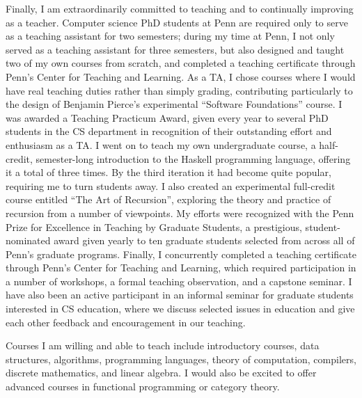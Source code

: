 \documentclass[12pt]{article}
\begin{document}
Finally, I am extraordinarily committed to teaching and to continually
improving as a teacher.  Computer science PhD students at Penn are
required only to serve as a teaching assistant for two semesters;
during my time at Penn, I not only served as a teaching assistant for
three semesters, but also designed and taught two of my own courses
from scratch, and completed a teaching certificate through Penn's
Center for Teaching and Learning.  As a TA, I chose courses where I
would have real teaching duties rather than simply grading,
contributing particularly to the design of Benjamin Pierce's
experimental ``Software Foundations'' course. I was awarded a Teaching
Practicum Award, given every year to several PhD students in the CS
department in recognition of their outstanding effort and enthusiasm
as a TA.  I went on to teach my own undergraduate course, a
half-credit, semester-long introduction to the Haskell programming
language, offering it a total of three times. By the third iteration
it had become quite popular, requiring me to turn students away.  I
also created an experimental full-credit course entitled ``The Art of
Recursion'', exploring the theory and practice of recursion from a
number of viewpoints.  My efforts were recognized with the Penn Prize
for Excellence in Teaching by Graduate Students, a prestigious,
student-nominated award given yearly to ten graduate students selected
from across all of Penn's graduate programs.  Finally, I concurrently
completed a teaching certificate through Penn's Center for Teaching
and Learning, which required participation in a number of workshops, a
formal teaching observation, and a capstone seminar.  I have also been
an active participant in an informal seminar for graduate students
interested in CS education, where we discuss selected issues in
education and give each other feedback and encouragement in our
teaching.

Courses I am willing and able to teach include introductory courses,
data structures, algorithms, programming languages, theory of
computation, compilers, discrete mathematics, and linear algebra. I
would also be excited to offer advanced courses in functional
programming or category theory.
\end{document}
